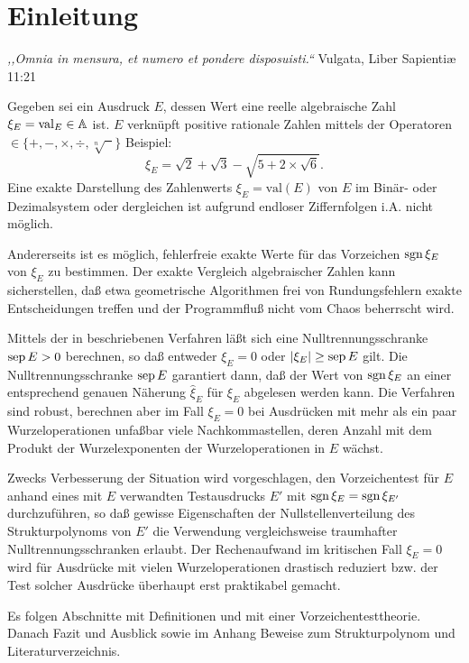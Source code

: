 %
%
\pagebreak
\section{Einleitung}\label{se:Einleitung}


\begin{flushright}
\begin{minipage}{6.85cm}
{\em ,,Omnia in mensura, et numero et pondere disposuisti.``} \hfill
\scriptsize{Vulgata, Liber Sapientiæ 11:21}
\end{minipage}
\end{flushright}


\noindent
Gegeben sei ein Ausdruck $E$,
dessen Wert eine reelle algebraische Zahl $\xi_E=\mathop{\rm val}\nolimits_E\in\mathbb{A}$ ist.
$E$ verknüpft positive rationale Zahlen
mittels der Operatoren $\in\{+, -, \times, \div, \sqrt[n]{\phantom{x}}\}$
Beispiel:
\begin{equation}\label{eq:ausdruck}
  \xi_E = \sqrt{2} + \sqrt{3} - \sqrt{5 + 2\times\sqrt{6}}.
\end{equation}
Eine exakte Darstellung des Zahlenwerts $\xi_E = \textrm{val}(E)$ von $E$ 
im Binär- oder Dezimalsystem oder dergleichen ist 
aufgrund endloser Ziffernfolgen i.A. nicht möglich.

Andererseits ist es möglich, fehlerfreie exakte Werte 
für das Vorzeichen $\operatorname{sgn}{\xi_E}$ von $\xi_E$ zu bestimmen. 
Der exakte Vergleich algebraischer Zahlen kann sicherstellen,
daß etwa geometrische Algorithmen
frei von Rundungsfehlern exakte Entscheidungen treffen
und der Programmfluß nicht vom Chaos beherrscht wird.

Mittels der
in \cite{Mignotte, BFMS, BFMSS, PIYAP} beschriebenen Verfahren
läßt sich eine Nulltrennungsschranke $\mathop{\rm sep}\nolimits E>0$ berechnen, 
so daß entweder $\xi_E=0$ oder $|\xi_E|\ge\mathop{\rm sep}\nolimits E$ gilt.  %
Die Nulltrennungsschranke $\mathop{\rm sep}\nolimits E$ garantiert dann, 
daß der Wert von $\operatorname{sgn}{\xi_E}$
an einer entsprechend genauen Näherung $\hat{\xi}_E$ für $\xi_E$
abgelesen werden kann.
Die Verfahren sind robust, 
berechnen aber im Fall $\xi_E=0$ 
bei Ausdrücken mit mehr als ein paar Wurzeloperationen
unfaßbar viele Nachkommastellen,
deren Anzahl mit dem Produkt der Wurzelexponenten
der Wurzeloperationen in $E$ wächst.

Zwecks Verbesserung der Situation wird vorgeschlagen,
den Vorzeichentest für $E$ 
anhand eines mit $E$ verwandten Testausdrucks $E'$ 
mit $\operatorname{sgn}\xi_E=\operatorname{sgn}\xi_{E'}$ durchzuführen,
so daß gewisse Eigenschaften der Nullstellenverteilung 
des Strukturpolynoms von $E'$ die Verwendung
vergleichsweise traumhafter Nulltrennungsschranken erlaubt.
Der Rechenaufwand im kritischen Fall $\xi_E=0$
wird für Ausdrücke mit vielen Wurzeloperationen 
drastisch reduziert bzw. der Test solcher Ausdrücke
überhaupt erst praktikabel gemacht.

Es folgen Abschnitte mit Definitionen
und mit einer Vorzeichentesttheorie.
Danach Fazit und Ausblick
sowie im Anhang Beweise zum Strukturpolynom
und Literaturverzeichnis.

%
%
